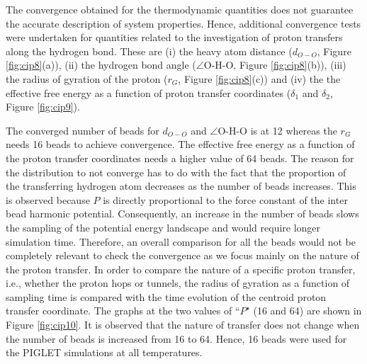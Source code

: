 The convergence obtained for the thermodynamic quantities does not guarantee the accurate description 
of system properties. Hence, additional convergence tests were undertaken for quantities related to 
the investigation of proton transfers along the hydrogen bond. These are (i) the 
heavy atom distance ($d_{O-O}$, Figure \ref{fig:cip8}(a)), (ii) the hydrogen bond angle 
($\angle$O-H-O, Figure \ref{fig:cip8}(b)), (iii) the radius of gyration of the proton ($r_G$, Figure 
\ref{fig:cip8}(c)) and (iv) the the effective free energy as a function of proton transfer coordinates
($\delta_1$ and $\delta_2$, Figure \ref{fig:cip9}). 

The converged number of beads for $d_{O-O}$ and  $\angle$O-H-O is at 12 whereas the $r_G$ needs 16 
beads to achieve convergence. The effective free energy as a function of the proton transfer 
coordinates needs a higher value of 64 beads. The reason for the distribution to not converge has to 
do with the fact that the proportion of the transferring hydrogen atom decreases as the number of 
beads increases. This is observed because $P$ is directly proportional to the force constant of the 
inter bead harmonic potential. Consequently, an increase in the number of beads slows the sampling of 
the potential energy landscape and would require longer simulation time. Therefore, an overall 
comparison for all the beads would not be completely relevant to check the convergence as we focus 
mainly on the nature of the proton transfer.  In order to compare the nature of a specific proton 
transfer, i.e., whether the proton hops or tunnels, the radius of gyration as a function of sampling time is compared with the time evolution of
the centroid proton transfer coordinate. The graphs at the two values of ``$P$" (16 and 64) are shown 
in Figure \ref{fig:cip10}. It is observed that the nature of transfer does not change when the number of 
beads is increased from 16 to 64. Hence, 16 beads were used for the PIGLET simulations at all 
temperatures.  

